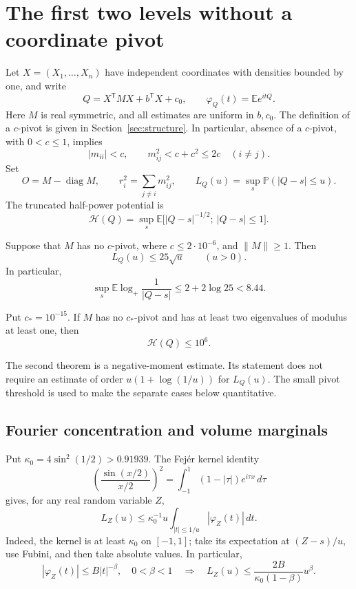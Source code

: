 \section{The first two levels without a coordinate pivot}
\label{sec:lower-levels}

Let $X=(X_1,\ldots,X_n)$ have independent coordinates with densities
bounded by one, and write
\[
 Q=X^{\mathsf T}MX+b^{\mathsf T}X+c_0,
 \qquad \varphi_Q(t)=\mathbb E e^{itQ}.
\]
Here $M$ is real symmetric, and all estimates are uniform in $b,c_0$.
The definition of a $c$-pivot is given in
Section~\ref{sec:structure}.  In particular, absence of a $c$-pivot,
with $0<c\leq1$, implies
\begin{equation}\label{lower:entry-cap}
 |m_{ii}|<c,\qquad m_{ij}^2<c+c^2\leq2c\quad(i\ne j).
\end{equation}
Set
\[
 O=M-\operatorname{diag}M,\qquad
 r_i^2=\sum_{j\ne i}m_{ij}^2,\qquad
 L_Q(u)=\sup_s\mathbb P(|Q-s|\leq u).
\]
The truncated half-power potential is
\[
 \mathcal H(Q)=\sup_s
 \mathbb E\bigl[|Q-s|^{-1/2};\ |Q-s|\leq1\bigr].
\]

\begin{theorem}\label{lower:one}
Suppose that $M$ has no $c$-pivot, where $c\leq2\cdot10^{-6}$,
and $\|M\|\geq1$.  Then
\[
 L_Q(u)\leq25\sqrt u\qquad(u>0).
\]
In particular,
\[
 \sup_s\mathbb E\log_+\frac1{|Q-s|}
 \leq2+2\log25<8.44.
\]
\end{theorem}

\begin{theorem}\label{lower:two}
Put $c_*=10^{-15}$.  If $M$ has no $c_*$-pivot and has at least
two eigenvalues of modulus at least one, then
\[
 \mathcal H(Q)\leq10^6.
\]
\end{theorem}

The second theorem is a negative-moment estimate.  Its statement does
not require an estimate of order $u(1+\log(1/u))$ for $L_Q(u)$.
The small pivot threshold is used to make the separate cases below
quantitative.

\subsection{Fourier concentration and volume marginals}

Put $\kappa_0=4\sin^2(1/2)>0.91939$.
The Fej\'er kernel identity
\[
 \left(\frac{\sin(x/2)}{x/2}\right)^2
 =\int_{-1}^1(1-|\tau|)e^{i\tau x}\,d\tau
\]
gives, for any real random variable $Z$,
\begin{equation}\label{lower:fejer}
 L_Z(u)\leq\kappa_0^{-1}u
             \int_{|t|\leq1/u}|\varphi_Z(t)|\,dt.
\end{equation}
Indeed, the kernel is at least $\kappa_0$ on $[-1,1]$;
take its expectation at $(Z-s)/u$, use Fubini, and then take absolute
values.  In particular,
\begin{equation}\label{lower:power-concentration}
 |\varphi_Z(t)|\leq B|t|^{-\beta},\quad 0<\beta<1
 \quad\Longrightarrow\quad
 L_Z(u)\leq\frac{2B}{\kappa_0(1-\beta)}u^\beta.
\end{equation}

